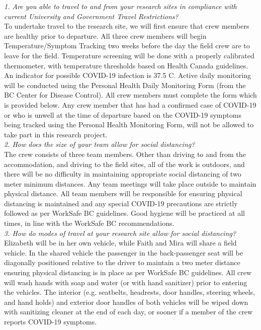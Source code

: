 \documentclass[11pt,letter]{article}
\begin{document}
\emph{1. Are you able to travel to and from your research sites in compliance with current University and Government Travel Restrictions?}\\
To undertake travel to the research site, we will first ensure that crew members are healthy prior to departure. All three crew members will begin Temperature/Symptom Tracking two weeks before the day the field crew are to leave for the field. Temperature screening will be done with a properly calibrated thermometer, with temperature thresholds based on Health Canada guidelines. An indicator for possible COVID-19 infection is 37.5 C. Active daily monitoring will be conducted using the Personal Health Daily Monitoring Form (from the BC Center for Disease Control). All crew members must complete the form which is provided below. Any crew member that has had a confirmed case of COVID-19 or who is unwell at the time of departure based on the COVID-19 symptoms being tracked using the Personal Health Monitoring Form, will not be allowed to take part in this research project.\\
   
\emph{2. How does the size of your team allow for social distancing?}\\
The crew consists of three team members. Other than driving to and from the accommodation, and driving to the field sites, all of the work is outdoors, and there will be no difficulty in maintaining appropriate social distancing of two meter minimum distances. Any team meetings will take place outside to maintain physical distance. All team members will be responsible for ensuring physical distancing is maintained and any special COVID-19 precautions are strictly followed as per WorkSafe BC guidelines. Good hygiene will be practiced at all times, in line with the  WorkSafe BC recommendations. \\

\emph{3. How do modes of travel at your research site allow for social distancing?}\\
Elizabeth will be in her own vehicle, while Faith and Mira will share a field vehicle. In the shared vehicle the passenger in the back-passenger seat will be diagonally positioned relative to the driver to maintain a two meter distance ensuring physical distancing is in place as per WorkSafe BC guidelines. All crew will wash hands with soap and water (or with hand sanitizer) prior to entering the vehicles. The interior (e.g. seatbelts, headrests, door handles, steering wheels, and hand holds) and exterior door handles of both vehicles will be wiped down with sanitizing cleaner at the end of each day, or sooner if a member of the crew reports COVID-19 symptoms.\\  
\end{document}
